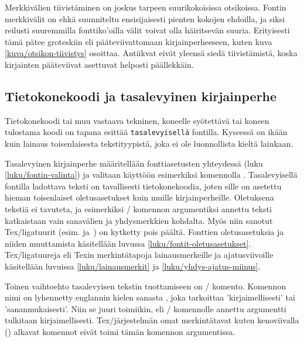 \noindent
Merkkivälien tiivistäminen on joskus tarpeen suurikokoisissa otsikoissa.
Fontin merkkivälit on ehkä suunniteltu ensisijaisesti pienten kokojen
ehdoilla, ja siksi reilusti suuremmilla fonttiko'oilla välit voivat olla
häiritsevän suuria. Erityisesti tämä pätee groteskiin eli
pääteviivattomaan kirjainperheeseen, kuten kuva
\ref{kuva/otsikon-tiivistys} osoittaa. Antiikvat eivät yleensä siedä
tiivistämistä, koska kirjainten pääteviivat asettuvat helposti
päällekkäin.


\subsection{Tietokonekoodi ja tasalevyinen kirjainperhe}

Tietokonekoodi tai muu vastaava tekninen, koneelle syötettävä tai koneen
tulostama koodi on tapana esittää \texttt{tasalevyisellä} fontilla.
Kyseessä on ikään kuin lainaus toisenlaisesta tekstityypistä, joka ei
ole luonnollista kieltä lainkaan.

Tasalevyinen kirjainperhe määritellään fonttiasetusten yhteydessä (luku
\ref{luku/fontin-valinta}) ja valitaan käyttöön esimerkiksi komennolla
. Tasalevyisellä fontilla ladottava teksti on
tavallisesti tietokonekoodia, joten sille on asetettu hieman
toisenlaiset oletusasetukset kuin muille kirjainperheille. Oletuksena
tekstiä ei tavuteta, ja esimerkiksi \-/ komennon
argumentiksi annettu teksti katkaistaan vain sanavälien ja yhdysmerkkien
kohdalta. Myös niin sanotut Tex\-/ligatuurit (esim. 
ja~\koodi{--}) on kytketty pois päältä. Fonttien oletusasetuksia ja
niiden muuttamista käsitellään luvussa
\ref{luku/fontit-oletusasetukset}. Tex\-/ligatuureja eli Texin
merkintätapoja lainausmerkeille ja ajatusviivoille käsitellään luvuissa
\ref{luku/lainausmerkit} ja \ref{luku/yhdys-ajatus-miinus}.

Toinen vaihtoehto tasalevyisen tekstin tuottamiseen on
\-/ komento. Komennon nimi on lyhennetty englannin kielen
sanasta , joka tarkoittaa 'kirjaimellisesti' tai
'sananmukaisesti'. Niin se juuri toimiikin, eli \-/
komennolle annettu argumentti tulkitaan kirjaimellisesti.
Tex\-/järjestelmän omat merkintätavat kuten kenoviivalla (\koodi{\keno})
alkavat komennot eivät toimi tämän komennon argumentissa.

